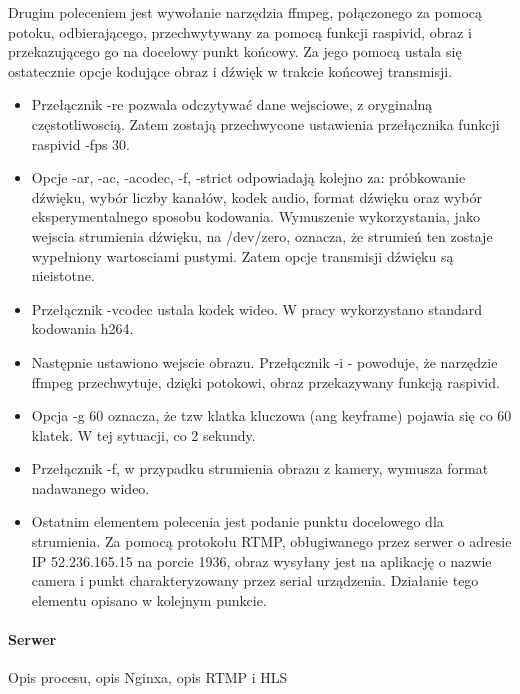Drugim poleceniem jest wywołanie narzędzia ffmpeg, połączonego za pomocą potoku, odbierającego, przechwytywany za pomocą funkcji raspivid, obraz i przekazującego go na docelowy punkt końcowy. Za jego pomocą ustala się ostatecznie opcje kodujące obraz i dźwięk w trakcie końcowej transmisji.
\begin{itemize}
\item Przełącznik -re pozwala odczytywać dane wejsciowe, z oryginalną częstotliwoscią. Zatem zostają przechwycone ustawienia przełącznika funkcji raspivid -fps 30.
\item Opcje  -ar, -ac, -acodec, -f, -strict odpowiadają kolejno za: próbkowanie dźwięku, wybór liczby kanałów, kodek audio, format dźwięku oraz wybór eksperymentalnego sposobu kodowania. Wymuszenie wykorzystania, jako wejscia strumienia dźwięku, na /dev/zero, oznacza, że strumień ten zostaje wypełniony wartosciami pustymi. Zatem opcje transmisji dźwięku są nieistotne.
\item Przełącznik -vcodec ustala kodek wideo. W pracy wykorzystano standard kodowania h264.
\item Następnie ustawiono wejscie obrazu. Przełącznik -i - powoduje, że narzędzie ffmpeg przechwytuje, dzięki potokowi, obraz przekazywany funkcją raspivid.
\item Opcja -g 60 oznacza, że tzw klatka kluczowa (ang keyframe) pojawia się co 60 klatek. W tej sytuacji, co 2 sekundy. 
\item Przełącznik -f, w przypadku strumienia obrazu z kamery, wymusza format nadawanego wideo.  
\item Ostatnim elementem polecenia jest podanie punktu docelowego dla strumienia. Za pomocą protokołu RTMP, obługiwanego przez serwer o adresie IP 52.236.165.15 na porcie 1936, obraz wysyłany jest na aplikację o nazwie camera i punkt charakteryzowany przez serial urządzenia. Działanie tego elementu opisano w kolejnym punkcie. 
\end{itemize}

\paragraph{Serwer}

Opis procesu, opis Nginxa, opis RTMP i HLS